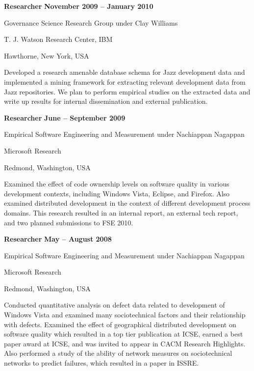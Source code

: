 \documentclass[margin,line,article]{res}
\newenvironment{list1}{
  \begin{list}{}{%
      \setlength{\itemsep}{0in}
      \setlength{\parsep}{0in} \setlength{\parskip}{0in}
      \setlength{\topsep}{0in} \setlength{\partopsep}{0in} 
      \setlength{\leftmargin}{0.17in}}}{\end{list}}
\begin{document}
\begin{resume}
\textbf{Researcher} \hfill \textbf{November 2009 -- January 2010}\\
\vspace{-10pt}
\begin{list1}
\item Governance Science Research Group under Clay Williams
\item T. J. Watson Research Center, IBM
\item Hawthorne, New York, USA
\vspace{6pt}
\item Developed a research amenable database schema for Jazz development
    data and implemented a mining framework for extracting relevant development
    data from Jazz repositories.  We plan to perform empirical studies on the
    extracted data and write up results for internal dissemination and external
    publication.
\end{list1}


\textbf{Researcher} \hfill \textbf{June -- September 2009}\\
\vspace{-10pt}
\begin{list1}
\item Empirical Software Engineering and Measurement under Nachiappan Nagappan
\item Microsoft Research
\item Redmond, Washington, USA
\vspace{6pt}
\item Examined the effect of code ownership levels on software quality in various
	development contexts, including Windows Vista, Eclipse, and Firefox.  Also
	examined distributed development in the context of different development
	process domains.  This research resulted in an internal report, an external
	tech report, and two planned submissions to FSE 2010.
\end{list1}

\textbf{Researcher} \hfill \textbf{May -- August 2008}\\
\vspace{-10pt}
\begin{list1}
\item Empirical Software Engineering and Measurement under Nachiappan Nagappan
\item Microsoft Research
\item Redmond, Washington, USA
\vspace{6pt}
\item Conducted quantitative analysis on defect data related to development of Windows 
Vista and examined many sociotechnical factors and their relationship with defects. 
Examined the effect of geographical distributed development on software quality which 
resulted in a top tier publication at ICSE, earned a best paper award at ICSE,
and was invited to appear in CACM Research Highlights.  Also performed a study
of the ability of network measures on sociotechnical networks to predict failures,
which resulted in a paper in ISSRE.
\end{list1}


\end{resume}
\end{document}
